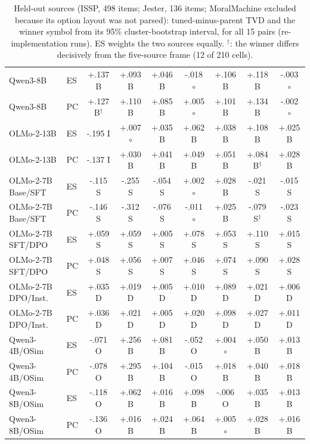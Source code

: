 \begin{table}[t]
\begin{tabular}{@{}llccccccc@{}}
Qwen3-8B & ES & +.137 B & +.093 B & +.046 B & -.018 $\circ$ & +.106 B & +.118 B & -.003 $\circ$ \\
Qwen3-8B & PC & +.127 B$^{\dagger}$ & +.110 B & +.085 B & +.005 $\circ$ & +.101 B & +.134 B & -.002 $\circ$ \\
OLMo-2-13B & ES & -.195 I & +.007 $\circ$ & +.035 B & +.062 B & +.038 B & +.108 B & +.025 B \\
OLMo-2-13B & PC & -.137 I & +.030 B & +.041 B & +.049 B & +.051 B & +.084 B$^{\dagger}$ & +.028 B \\
OLMo-2-7B Base/SFT & ES & -.115 S & -.255 S & -.054 S & +.002 $\circ$ & +.028 B & -.021 S & -.015 S \\
OLMo-2-7B Base/SFT & PC & -.146 S & -.312 S & -.076 S & -.011 $\circ$ & +.025 B & -.079 S$^{\dagger}$ & -.023 S \\
OLMo-2-7B SFT/DPO & ES & +.059 S & +.059 S & +.005 S & +.078 S & +.053 S & +.110 S & +.015 S \\
OLMo-2-7B SFT/DPO & PC & +.048 S & +.056 S & +.007 S & +.046 S & +.074 S & +.090 S & +.028 S \\
OLMo-2-7B DPO/Inst. & ES & +.035 D & +.019 D & +.005 D & +.010 D & +.089 D & +.021 D & +.006 D \\
OLMo-2-7B DPO/Inst. & PC & +.036 D & +.021 D & +.005 D & +.020 D & +.098 D & +.027 D & +.011 D \\
Qwen3-4B/OSim & ES & -.071 O & +.256 B & +.081 B & -.052 O & +.004 $\circ$ & +.050 B & +.013 B \\
Qwen3-4B/OSim & PC & -.078 O & +.295 B & +.104 B & -.015 O & +.018 B & +.040 B & +.018 B \\
Qwen3-8B/OSim & ES & -.118 O & +.062 B & +.016 B & +.098 B & -.006 O & +.035 B & +.013 B \\
Qwen3-8B/OSim & PC & -.136 O & +.016 B & +.024 B & +.064 B & +.005 $\circ$ & +.028 B & +.016 B \\
\bottomrule
\end{tabular}
\caption{Held-out sources (ISSP, 498 items; Jester, 136 items; MoralMachine excluded because its option layout was not parsed): tuned-minus-parent TVD and the winner symbol from its 95\% cluster-bootstrap interval, for all 15 pairs (re-implementation runs). ES weights the two sources equally. $^{\dagger}$: the winner differs decisively from the five-source frame (12 of 210 cells).}
\label{tab:heldout}
\end{table}
